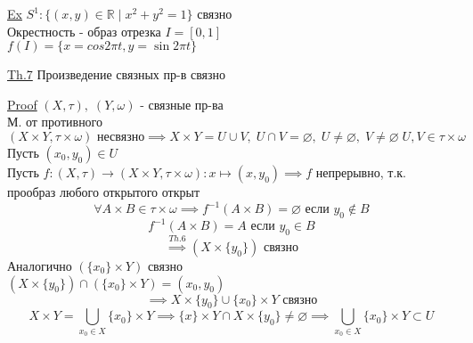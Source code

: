 \documentclass[a4paper]{article}
\begin{document}
\underline{Ex} $ S^{1}: \{ (x,y) \in \mathbb{R} \; |\; x^2 + y^2 =1 \} $ связно\\
Окрестность - образ отрезка $ I = [0,1] $ \\
$ f(I) = \{ x = cos2\pi t, y = \sin 2\pi t\} $ 

\begin{tcolorbox}
\underline{Th.7} Произведение связных пр-в связно

\underline{Proof} $ (X, \tau), \; (Y, \omega) $ - связные пр-ва\\
М. от противного\\
\[
    (X \times Y, \tau \times \omega) \text{ несвязно} \implies X \times Y = 
    U \cup V, \; U \cap V = \varnothing, \; U \neq \varnothing, \; V \neq \varnothing
    \; U,V \in \tau \times \omega
\]
Пусть $ (x_0, y_0) \in U $\\
Пусть $ f: (X, \tau) \to (X \times Y, \tau \times \omega): x \mapsto (x,y_0) 
\implies f$ непрерывно, т.к. прообраз любого открытого открыт
\[
    \forall A \times B \in \tau \times \omega \implies f^{-1}(A \times B) =
    \varnothing \text{ если } y_0 \notin B
\]
\[
    f^{-1}(A \times B) = A \text{ если } y_0 \in B
\]
\[
    \stackrel{Th.6}{\implies} (X \times \{y_0\}) \text{ связно}
\]
Аналогично $ (\{x_0\} \times Y) $ связно\\
$ (X \times \{y_0\}) \cap (\{x_0\} \times Y) = (x_0,y_0) $
\[
    \implies X \times \{y_0\} \cup \{x_0\} \times Y \text{ связно}
\]
\[
    X \times Y = \bigcup_{x_0 \in X} \{x_0\} \times Y \implies \{x\} \times Y
    \cap X \times \{y_0\} \neq \varnothing \implies \bigcup_{x_0 \in X}\{x_0\} \times Y
    \subset U
\]
\end{tcolorbox}
\end{document}
